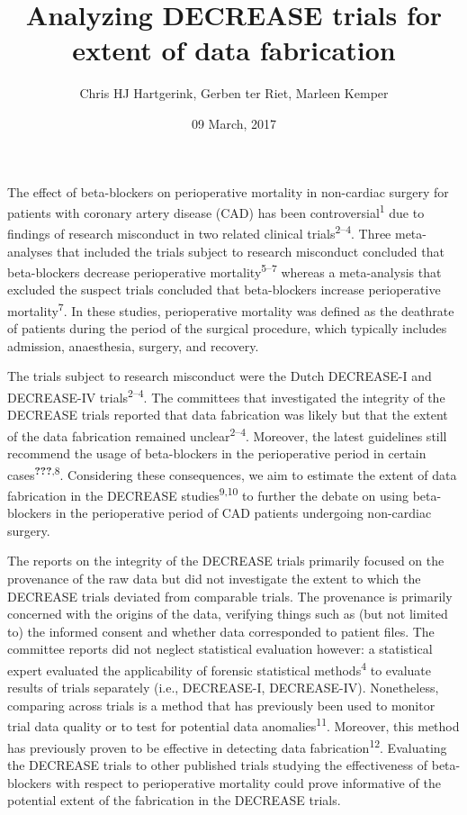 \documentclass[]{article}
\title{Analyzing DECREASE trials for extent of data fabrication}
\author{Chris HJ Hartgerink, Gerben ter Riet, Marleen Kemper}
\date{09 March, 2017}
\begin{document}
\maketitle

The effect of beta-blockers on perioperative mortality in non-cardiac
surgery for patients with coronary artery disease (CAD) has been
controversial\textsuperscript{1} due to findings of research misconduct
in two related clinical trials\textsuperscript{2--4}. Three
meta-analyses that included the trials subject to research misconduct
concluded that beta-blockers decrease perioperative
mortality\textsuperscript{5--7} whereas a meta-analysis that excluded
the suspect trials concluded that beta-blockers increase perioperative
mortality\textsuperscript{7}. In these studies, perioperative mortality
was defined as the deathrate of patients during the period of the
surgical procedure, which typically includes admission, anaesthesia,
surgery, and recovery.

The trials subject to research misconduct were the Dutch DECREASE-I and
DECREASE-IV trials\textsuperscript{2--4}. The committees that
investigated the integrity of the DECREASE trials reported that data
fabrication was likely but that the extent of the data fabrication
remained unclear\textsuperscript{2--4}. Moreover, the latest guidelines
still recommend the usage of beta-blockers in the perioperative period
in certain cases\textsuperscript{{\textbf{???}},8}. Considering these
consequences, we aim to estimate the extent of data fabrication in the
DECREASE studies\textsuperscript{9,10} to further the debate on using
beta-blockers in the perioperative period of CAD patients undergoing
non-cardiac surgery.

The reports on the integrity of the DECREASE trials primarily focused on
the provenance of the raw data but did not investigate the extent to
which the DECREASE trials deviated from comparable trials. The
provenance is primarily concerned with the origins of the data,
verifying things such as (but not limited to) the informed consent and
whether data corresponded to patient files. The committee reports did
not neglect statistical evaluation however: a statistical expert
evaluated the applicability of forensic statistical
methods\textsuperscript{4} to evaluate results of trials separately
(i.e., DECREASE-I, DECREASE-IV). Nonetheless, comparing across trials is
a method that has previously been used to monitor trial data quality or
to test for potential data anomalies\textsuperscript{11}. Moreover, this
method has previously proven to be effective in detecting data
fabrication\textsuperscript{12}. Evaluating the DECREASE trials to other
published trials studying the effectiveness of beta-blockers with
respect to perioperative mortality could prove informative of the
potential extent of the fabrication in the DECREASE trials.
\end{document}
